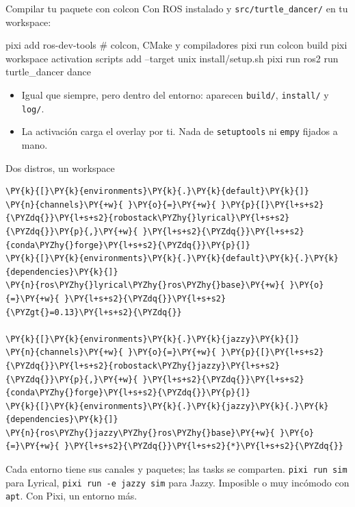 \documentclass[aspectratio=169]{beamer}
\begin{document}
\begin{frame}[fragile]{Compilar tu paquete con colcon}
Con ROS instalado y \lstinline|src/turtle_dancer/| en tu workspace:
\begin{terminal}
pixi add ros-dev-tools        # colcon, CMake y compiladores
pixi run colcon build
pixi workspace activation scripts add --target unix install/setup.sh
pixi run ros2 run turtle_dancer dance
\end{terminal}
\vfill
\begin{itemize}
    \item Igual que siempre, pero dentro del entorno: aparecen \lstinline|build/|, \lstinline|install/| y \lstinline|log/|.
    \item La activación carga el overlay por ti. Nada de \texttt{setuptools} ni \texttt{empy} fijados a mano.
\end{itemize}
\end{frame}

\begin{frame}[fragile]{Dos distros, un workspace}
\begin{filelisting}
\begin{Verbatim}[commandchars=\\\{\},breaklines,breakanywhere]
\PY{k}{[}\PY{k}{environments}\PY{k}{.}\PY{k}{default}\PY{k}{]}
\PY{n}{channels}\PY{+w}{ }\PY{o}{=}\PY{+w}{ }\PY{p}{[}\PY{l+s+s2}{\PYZdq{}}\PY{l+s+s2}{robostack\PYZhy{}lyrical}\PY{l+s+s2}{\PYZdq{}}\PY{p}{,}\PY{+w}{ }\PY{l+s+s2}{\PYZdq{}}\PY{l+s+s2}{conda\PYZhy{}forge}\PY{l+s+s2}{\PYZdq{}}\PY{p}{]}
\PY{k}{[}\PY{k}{environments}\PY{k}{.}\PY{k}{default}\PY{k}{.}\PY{k}{dependencies}\PY{k}{]}
\PY{n}{ros\PYZhy{}lyrical\PYZhy{}ros\PYZhy{}base}\PY{+w}{ }\PY{o}{=}\PY{+w}{ }\PY{l+s+s2}{\PYZdq{}}\PY{l+s+s2}{\PYZgt{}=0.13}\PY{l+s+s2}{\PYZdq{}}

\PY{k}{[}\PY{k}{environments}\PY{k}{.}\PY{k}{jazzy}\PY{k}{]}
\PY{n}{channels}\PY{+w}{ }\PY{o}{=}\PY{+w}{ }\PY{p}{[}\PY{l+s+s2}{\PYZdq{}}\PY{l+s+s2}{robostack\PYZhy{}jazzy}\PY{l+s+s2}{\PYZdq{}}\PY{p}{,}\PY{+w}{ }\PY{l+s+s2}{\PYZdq{}}\PY{l+s+s2}{conda\PYZhy{}forge}\PY{l+s+s2}{\PYZdq{}}\PY{p}{]}
\PY{k}{[}\PY{k}{environments}\PY{k}{.}\PY{k}{jazzy}\PY{k}{.}\PY{k}{dependencies}\PY{k}{]}
\PY{n}{ros\PYZhy{}jazzy\PYZhy{}ros\PYZhy{}base}\PY{+w}{ }\PY{o}{=}\PY{+w}{ }\PY{l+s+s2}{\PYZdq{}}\PY{l+s+s2}{*}\PY{l+s+s2}{\PYZdq{}}
\end{Verbatim}
\end{filelisting}
\vfill
Cada entorno tiene sus canales y paquetes; las tasks se comparten.
\lstinline|pixi run sim| para Lyrical, \lstinline|pixi run -e jazzy sim| para Jazzy.
\vfill
\small Imposible o muy incómodo con \texttt{apt}. Con Pixi, un entorno más.
\end{frame}
\end{document}
